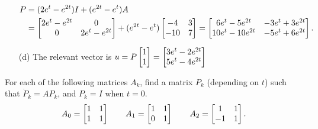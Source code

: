 \documentclass[a4paper]{amsart}
\begin{document}
\begin{solution}
\begin{itemize}
\begin{align*}
    P &= (2e^t-e^{2t})I + (e^{2t}-e^t)A \\
      &= \left[\begin{matrix} 2e^t-e^{2t} & 0 \\ 0 & 2e^t-e^{2t} \end{matrix}\right] +
         (e^{2t}-e^t)\left[\begin{matrix} -4 & 3 \\ -10 & 7 \end{matrix}\right] 
       = \left[\begin{matrix} 6e^t - 5e^{2t} & -3e^t + 3e^{2t} \\
              10e^t - 10e^{2t} & -5 e^t + 6 e^{2t} \end{matrix}\right].
   \end{align*}
  \item[(d)] The relevant vector is 
   $u=P\left[\begin{matrix} 1\\ 1\end{matrix}\right] = \left[\begin{matrix} 3e^t - 2e^{2t}\\ 5e^t - 4e^{2t}\end{matrix}\right]$
 \end{itemize}
\end{solution}

\begin{exercise}\label{ex-fundamental-a}
 For each of the following matrices $A_k$, find a matrix
 $P_k$ (depending on $t$) such that $\dot{P}_k=AP_k$, and $P_k=I$
 when $t=0$.
 \[ A_0 = \left[\begin{matrix} 1 & 1 \\  1 & 1 \end{matrix}\right] \qquad
    A_1 = \left[\begin{matrix} 1 & 1 \\  0 & 1 \end{matrix}\right] \qquad      
    A_2 = \left[\begin{matrix} 1 & 1 \\ -1 & 1 \end{matrix}\right].
 \]
\end{exercise}
\end{document}
